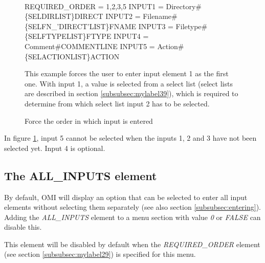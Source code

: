 \documentclass[a4paper]{book}
\newcommand{\vs}{\vspace{3mm}}
\renewcommand{\indent}{\hspace*{5mm}}
\begin{document}
\begin{figure}[ht]
\begin{minipage}[t]{\textwidth}
\hrulefill \\
\begin{ttfamily}
 \newline
\indent REQUIRED{\_}ORDER = 1,2,3,5 \newline
\indent INPUT1 = Directory{\#}{\{}SEL\textbar DIRLIST{\}}DIRECT \newline
\indent INPUT2 = Filename{\#}{\{}SEL\textbar FN{\_}'DIRECT'LIST{\}}FNAME \newline
\indent INPUT3 = Filetype{\#}{\{}SEL\textbar FTYPELIST{\}}FTYPE \newline
\indent INPUT4 = Comment{\#}COMMENTLINE \newline
\indent INPUT5 = Action{\#}{\{}SEL\textbar ACTIONLIST{\}}ACTION \newline
\end{ttfamily}
\noindent This example forces the user to enter input element 1 as the first one. With 
input 1, a value is selected from a select list (select lists are described 
in section \ref{subsubsec:mylabel39}), which is required to determine 
from which select list input 2 has to be selected.
\caption{Force the order in which input is entered}\label{fig:reqorder}
\hrulefill
\end{minipage}
\end{figure}

In figure \ref{fig:reqorder}, input 5 cannot be selected when the inputs 1, 2 and 3 have 
not been selected yet. Input 4 is optional.

\subsection{The ALL{\_}INPUTS element}
\label{subsubsec:mylabel30}

By default, OMI will display an option that can be selected to enter all 
input elements without selecting them separately (see also section 
\ref{subsubsec:entering}). Adding the \textsl{ALL{\_}INPUTS} element to a menu 
section with value \textsl{0} or \textsl{FALSE} can disable this.

\vs

This element will be disabled by default when the \textsl{REQUIRED{\_}ORDER} element 
(see section \ref{subsubsec:mylabel29}) is specified for this menu.
\end{document}
